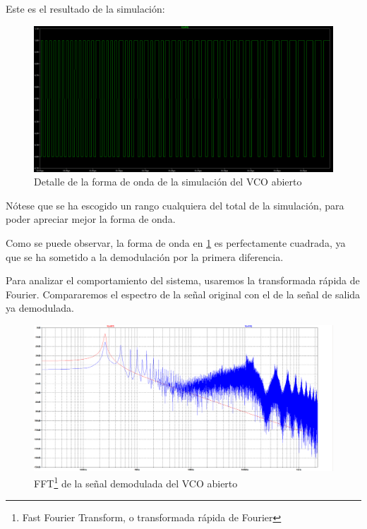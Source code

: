 \documentclass[12pt]{report} %
\begin{document}
	
	Este es el resultado de la simulación:
	
	\begin{figure}[H]
		\includegraphics[width=\textwidth]{vco-open-first-diff-waveform.png}
		\caption[Detalle de la forma de onda de la simulación del VCO abierto]{Detalle de la forma de onda de la simulación del VCO abierto}
		\label{fig:vco-open-first-diff-waveform.png}
	\end{figure}

	Nótese que se ha escogido un rango cualquiera del total de la simulación, para poder apreciar mejor la forma de onda.
	
	Como se puede observar, la forma de onda en \ref{fig:vco-open-first-diff-waveform.png} es perfectamente cuadrada, ya que se ha sometido a la demodulación por la primera diferencia.
	
	Para analizar el comportamiento del sistema, usaremos la transformada rápida de Fourier. Compararemos el espectro de la señal original con el de la señal de salida ya demodulada.
	
	\begin{figure}[H]
		\includegraphics[width=\textwidth]{vco-open-first-diff-fft-2.png}
		\caption[FFT de la señal demodulada del VCO abierto]{FFT\footnote{Fast Fourier Transform, o transformada rápida de Fourier} de la señal demodulada del VCO abierto}
		\label{fig:vco-open-first-diff-fft-2.png}
	\end{figure}
\end{document}
